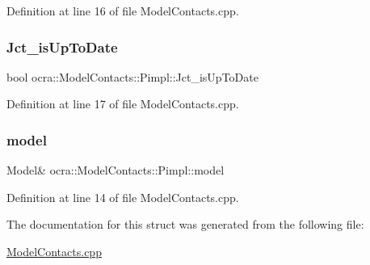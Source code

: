 Definition at line 16 of file Model\+Contacts.\+cpp.

\hypertarget{structocra_1_1ModelContacts_1_1Pimpl_ac0fa66cfb8b54718dd3a03c683819c6d}{}\label{structocra_1_1ModelContacts_1_1Pimpl_ac0fa66cfb8b54718dd3a03c683819c6d} 
\subsubsection{\texorpdfstring{Jct\+\_\+is\+Up\+To\+Date}{Jct\_isUpToDate}}
{\footnotesize\ttfamily bool ocra\+::\+Model\+Contacts\+::\+Pimpl\+::\+Jct\+\_\+is\+Up\+To\+Date}



Definition at line 17 of file Model\+Contacts.\+cpp.

\hypertarget{structocra_1_1ModelContacts_1_1Pimpl_a16998d1fe02ccbb3a3f2282d5ddc5074}{}\label{structocra_1_1ModelContacts_1_1Pimpl_a16998d1fe02ccbb3a3f2282d5ddc5074} 
\subsubsection{\texorpdfstring{model}{model}}
{\footnotesize\ttfamily Model\& ocra\+::\+Model\+Contacts\+::\+Pimpl\+::model}



Definition at line 14 of file Model\+Contacts.\+cpp.



The documentation for this struct was generated from the following file\+:\begin{DoxyCompactItemize}
\item 
\hyperlink{ModelContacts_8cpp}{Model\+Contacts.\+cpp}\end{DoxyCompactItemize}
